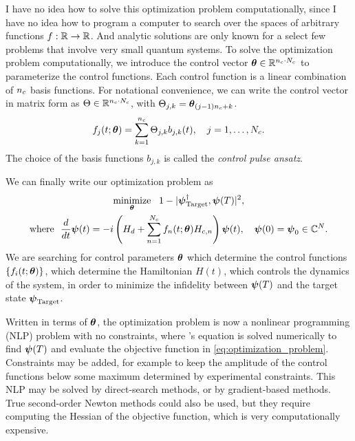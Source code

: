 \documentclass[letterpaper]{tufte-handout}
\begin{document}
I have no idea how to solve this optimization problem computationally, since I have no idea how to program a computer to search over the spaces of arbitrary functions $f: \mathbb{R} \rightarrow \mathbb{R}$. And analytic solutions are only known for a select few problems that involve very small quantum systems. To solve the optimization problem computationally, we introduce the control vector $\boldsymbol{\theta} \in \mathbb{R}^{{n_c}\cdot{N_c}  }$ to parameterize the control functions. Each control function is a linear combination of ${n_c}$ basis functions. For notational convenience, we can write the control vector in matrix form as $\Theta \in \mathbb{R}^{{n_c} \cdot {N_c}}$, with $\Theta_{j,k} = \boldsymbol{\theta}_{(j-1){n_c} + k}$.
\begin{equation} \label{eq:control_pulse_ansatz}
    f_j(t;\boldsymbol{\theta}) = \sum_{k=1}^{{n_c}} \Theta_{j,k} b_{j,k}(t), \quad j = 1,\dots,{N_c}.
\end{equation}
The choice of the basis functions ${b_{j,k}}$ is called the \emph{control pulse ansatz}.

We can finally write our optimization problem as
\begin{gather}
    \operatorname*{minimize}_{\boldsymbol{\theta}}\ \  1 - |\boldsymbol{\psi}_{\textrm{Target}}^\dagger, \boldsymbol{\psi}(T)|^2, \label{eq:optimization_problem}\\
    \textrm{where}\ \ \frac{d}{dt}\boldsymbol{\psi}(t) = -i\left(H_d + \sum_{n=1}^{N_c} f_n(t;\boldsymbol{\theta})H_{c,n}\right)\boldsymbol{\psi}(t),\quad \boldsymbol{\psi}(0) = \boldsymbol{\psi}_0 \in \mathbb{C}^N. \nonumber
\end{gather}
We are searching for control parameters $\boldsymbol{\theta}$ which determine the control functions $\{f_i(t;\boldsymbol{\theta})\}$, which determine the Hamiltonian $H(t)$, which controls the dynamics of the system, in order to minimize the infidelity between $\boldsymbol{\psi}(T)$ and the target state $\boldsymbol{\psi}_{\textrm{Target}}$.

Written in terms of $\boldsymbol{\theta}$, the optimization problem is now a nonlinear programming (NLP) problem with no constraints, where \Schrodinger's equation is solved numerically to find $\boldsymbol{\psi}(T)$ and evaluate the objective function in \eqref{eq:optimization_problem}. Constraints may be added, for example to keep the amplitude of the control functions below some maximum determined by experimental constraints. This NLP may be solved by direct-search methods, or by gradient-based methods. True second-order Newton methods could also be used, but they require computing the Hessian of the objective function, which is very computationally expensive.
\end{document}
